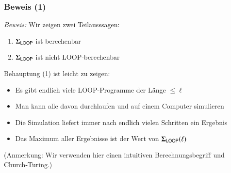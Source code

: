 \documentclass[onlymath]{beamer}
\begin{document}
\begin{frame}[t]\frametitle{Beweis (1)}

\pause

\emph{Beweis:} Wir zeigen zwei Teilausssagen:

\begin{enumerate}[(1)]
\item $\boldsymbol{\Sigma}_{\textsf{LOOP}}$ ist berechenbar
\item $\boldsymbol{\Sigma}_{\textsf{LOOP}}$ ist nicht LOOP-berechenbar
\end{enumerate}\pause\medskip

Behauptung (1) ist leicht zu zeigen:
\begin{itemize}
\item Es gibt endlich viele LOOP-Programme der Länge $\leq \ell$
\item Man kann alle davon durchlaufen und auf einem Computer simulieren
\item Die Simulation liefert immer nach endlich vielen Schritten ein Ergebnis
\item Das Maximum aller Ergebnisse ist der Wert von $\boldsymbol{\Sigma}_{\textsf{LOOP}}(\ell)$
\end{itemize}
{\footnotesize (Anmerkung: Wir verwenden hier einen intuitiven Berechnungsbegriff und Church-Turing.)
}

\end{frame}
\end{document}
